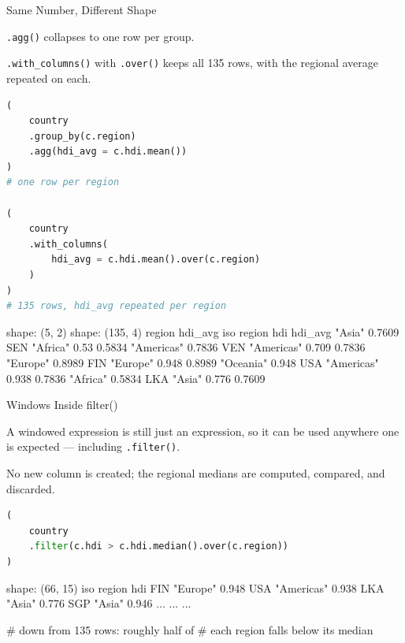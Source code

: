 \documentclass[8pt,aspectratio=169]{beamer}
\begin{document}
\begin{frame}[fragile]{Same Number, Different Shape}
\begin{splitcode}{%

\texttt{.agg()} collapses to one row per group.

\texttt{.with\_columns()} with \texttt{.over()} keeps all 135 rows, with the regional average repeated on each.

}
\begin{lstlisting}[language=Python]
(
    country
    .group_by(c.region)
    .agg(hdi_avg = c.hdi.mean())
)
# one row per region

(
    country
    .with_columns(
        hdi_avg = c.hdi.mean().over(c.region)
    )
)
# 135 rows, hdi_avg repeated per region
\end{lstlisting}
\begin{codeoutput}
shape: (5, 2)         shape: (135, 4)
region      hdi_avg   iso  region      hdi    hdi_avg
"Asia"      0.7609    SEN  "Africa"    0.53   0.5834
"Americas"  0.7836    VEN  "Americas"  0.709  0.7836
"Europe"    0.8989    FIN  "Europe"    0.948  0.8989
"Oceania"   0.948     USA  "Americas"  0.938  0.7836
"Africa"    0.5834    LKA  "Asia"      0.776  0.7609
\end{codeoutput}
\end{splitcode}
\end{frame}

\begin{frame}[fragile]{Windows Inside filter()}
\begin{splitcode}{%

A windowed expression is still just an expression, so it can be used anywhere one is expected --- including \texttt{.filter()}.

No new column is created; the regional medians are computed, compared, and discarded.

}
\begin{lstlisting}[language=Python]
(
    country
    .filter(c.hdi > c.hdi.median().over(c.region))
)
\end{lstlisting}
\begin{codeoutput}
shape: (66, 15)
iso  region       hdi
FIN  "Europe"     0.948
USA  "Americas"   0.938
LKA  "Asia"       0.776
SGP  "Asia"       0.946
...  ...          ...

# down from 135 rows: roughly half of
# each region falls below its median
\end{codeoutput}
\end{splitcode}
\end{frame}
\end{document}
